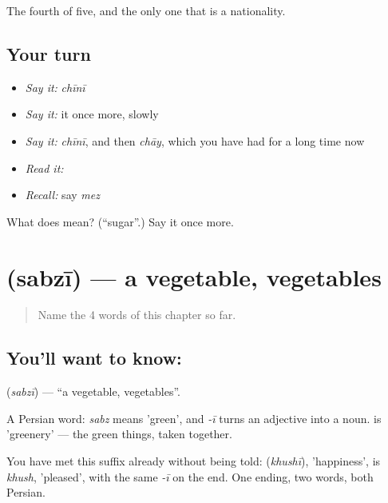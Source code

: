\begin{grammarlens}[title={What you've built}]
The fourth of five, and the only one that is a nationality.
\end{grammarlens}

\subsection*{Your turn}
\begin{itemize}
\raggedright
  \item \emph{Say it:} \emph{chīnī}
  \item \emph{Say it:} it once more, slowly
  \item \emph{Say it:} \emph{chīnī}, and then \emph{chāy}, which you have had for a long time now
  \item \emph{Read it:} \textbf{}
  \item \emph{Recall:} say \emph{mez}
\end{itemize}

\begin{tcolorbox}[breakable,colback=teal!4,colframe=teal!35!black,title={Before you move on}]
What does  mean? (\textquotedblleft{}sugar\textquotedblright{}.) Say it once more.
\end{tcolorbox}
\section[\texorpdfstring{\hi{सब्ज़ी} (sabzī)}{सब्ज़ी (sabzī)}]{ (sabzī) — a vegetable, vegetables}

\label{lesson:HI-C52-vegetable}



\begin{quote}
Name the 4 words of this chapter so far.
\end{quote}

\subsection*{You'll want to know: }
\textbf{} (\emph{sabzī}) — \textquotedblleft{}a vegetable, vegetables\textquotedblright{}.

A Persian word: \emph{sabz} means 'green', and \emph{-ī} turns an adjective into a noun.  is 'greenery' — the green things, taken together.

You have met this suffix already without being told:  (\emph{khushī}), 'happiness', is \emph{khush}, 'pleased', with the same \emph{-ī} on the end. One ending, two words, both Persian.

